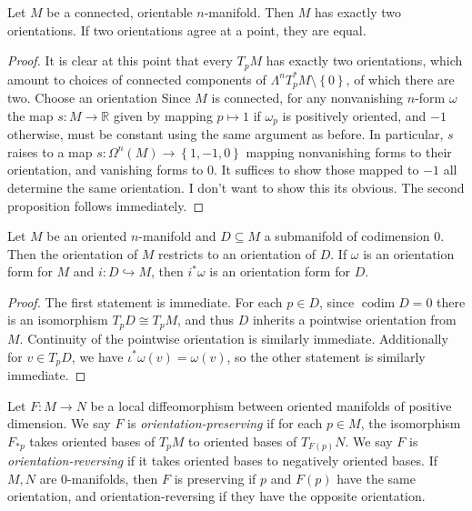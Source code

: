 \begin{proposition}\label{4.2.7}
	Let $M$ be a connected, orientable $n$-manifold. Then $M$ has exactly two orientations. If two orientations agree at a point, they are equal.
\end{proposition}
\begin{proof}
	It is clear at this point that every $T_pM$ has exactly two orientations, which amount to choices of connected components of $\Lambda ^nT_p^*M\setminus \left\{ 0 \right\} $, of which there are two. Choose an orientation Since $M$ is connected, for any nonvanishing $n$-form $\omega $ the map $s : M \to \mathbb{R} $ given by mapping $p\mapsto 1$ if $\omega _p$ is positively oriented, and $-1$ otherwise, must be constant using the same argument as before. In particular, $s$ raises to a map $s : \Omega^n(M) \to \left\{ 1,-1,0 \right\} $ mapping nonvanishing forms to their orientation, and vanishing forms to $0$. It suffices to show those mapped to $-1$ all determine the same orientation. I don't want to show this its obvious. The second proposition follows immediately.
\end{proof}

\begin{proposition}\label{4.2.8}
	Let $M$ be an oriented $n$-manifold and $D\subseteq M$ a submanifold of codimension 0. Then the orientation of $M$ restricts to an orientation of $D$. If $\omega $ is an orientation form for $M$ and $i : D \hookrightarrow M$, then $i^*\omega $ is an orientation form for $D$.
\end{proposition}
\begin{proof}
	The first statement is immediate. For each $p\in D$, since $\operatorname{codim} D=0$ there is an isomorphism $T_pD\cong T_pM$, and thus $D$ inherits a pointwise orientation from $M$. Continuity of the pointwise orientation is similarly immediate. Additionally for $v\in T_pD$, we have $\iota ^*\omega (v)=\omega (v)$, so the other statement is similarly immediate.
\end{proof}

Let $F : M \to N$ be a local diffeomorphism between oriented manifolds of positive dimension. We say $F$ is \emph{orientation-preserving} if for each $p\in M$, the isomorphism $F_{*p} $ takes oriented bases of $T_pM$ to oriented bases of $T_{F(p)} N$. We say $F$ is \emph{orientation-reversing} if it takes oriented bases to negatively oriented bases. If $M,N$ are 0-manifolds, then $F$ is preserving if $p$ and $F(p)$ have the same orientation, and orientation-reversing if they have the opposite orientation.

